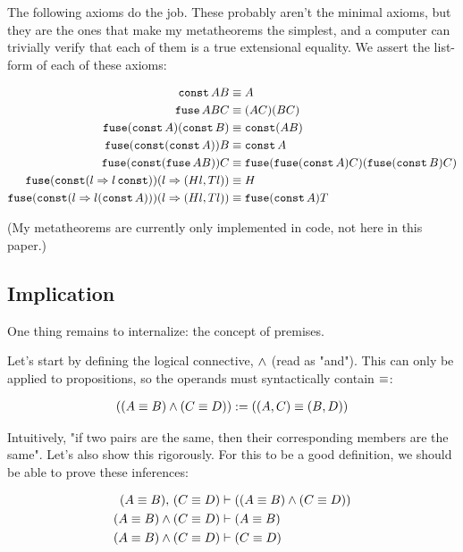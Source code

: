 \documentclass{article}
\begin{document}
  The following axioms do the job. These probably aren't the minimal axioms, but they are the ones that make my metatheorems the simplest, and a computer can trivially verify that each of them is a true extensional equality. We assert the list-form of each of these axioms:
  
  \begin{align*}
  \operatorname{\texttt{const}} A B &\equiv A\\
\operatorname{\texttt{fuse}} A B C &\equiv (A C) (B C)\\
\operatorname{\texttt{fuse}} (\operatorname{\texttt{const}} A) (\operatorname{\texttt{const}} B) &\equiv \operatorname{\texttt{const}} (A B)\\
\operatorname{\texttt{fuse}} (\operatorname{\texttt{const}} (\operatorname{\texttt{const}} A)) B &\equiv \operatorname{\texttt{const}} A\\
\operatorname{\texttt{fuse}} (\operatorname{\texttt{const}} (\operatorname{\texttt{fuse}} A B)) C &\equiv \operatorname{\texttt{fuse}} (\operatorname{\texttt{fuse}} (\operatorname{\texttt{const}} A) C) (\operatorname{\texttt{fuse}} (\operatorname{\texttt{const}} B) C)\\
\operatorname{\texttt{fuse}} (\operatorname{\texttt{const}} (l \Rightarrow l \operatorname{\texttt{const}})) (l \Rightarrow (Hl, Tl)) &\equiv H\\
\operatorname{\texttt{fuse}} (\operatorname{\texttt{const}} (l \Rightarrow l (\operatorname{\texttt{const}} A))) (l \Rightarrow (Hl, Tl)) &\equiv \operatorname{\texttt{fuse}} (\operatorname{\texttt{const}} A) T\\
   \end{align*}
   
  (My metatheorems are currently only implemented in code, not here in this paper.)
 
  \subsection{Implication}
  
  One thing remains to internalize: the concept of premises.
  
  Let's start by defining the logical connective, $\wedge$ (read as "and"). This can only be applied to propositions, so the operands must syntactically contain $\equiv$:
  
  \begin{align*}
    ((A \equiv B) \wedge (C \equiv D)):= ((A,C) \equiv (B,D)) 
  \end{align*}
  
  Intuitively, "if two pairs are the same, then their corresponding members are the same". Let's also show this rigorously. For this to be a good definition, we should be able to prove these inferences:
  
  \begin{align*}
    (A \equiv B) ,\, (C \equiv D) &\vdash ((A \equiv B) \wedge (C \equiv D)) \\
    (A \equiv B) \wedge (C \equiv D) &\vdash (A \equiv B) \\
    (A \equiv B) \wedge (C \equiv D) &\vdash (C \equiv D) \\
  \end{align*}
  
\end{document}
